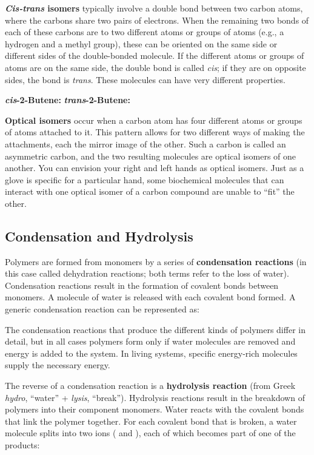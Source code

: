\documentclass{report}
\begin{document}
\textbf{\emph{Cis-trans} isomers} typically involve a double bond between two carbon atoms, where the carbons share two pairs of electrons. When the remaining two bonds of each of these carbons are to two different atoms or groups of atoms (e.g., a hydrogen and a methyl group), these can be oriented on the same side or different sides of the double-bonded molecule. If the different atoms or groups of atoms are on the same side, the double bond is called \emph{cis}; if they are on opposite sides, the bond is \emph{trans}. These molecules can have very different properties.
\begin{center}
\textbf{\emph{cis}-2-Butene:}  \qquad
\textbf{\emph{trans}-2-Butene:} 
\end{center}

\textbf{Optical isomers} occur when a carbon atom has four different atoms or groups of atoms attached to it. This pattern allows for two different ways of making the attachments, each the mirror image of the other. Such a carbon is called an asymmetric carbon, and the two resulting molecules are optical isomers of one another. You can envision your right and left hands as optical isomers. Just as a glove is specific for a particular hand, some biochemical molecules that can interact with one optical isomer of a carbon compound are unable to ``fit'' the other.

\subsection{Condensation and Hydrolysis}

Polymers are formed from monomers by a series of \textbf{condensation reactions} (in this case called dehydration reactions; both terms refer to the loss of water). Condensation reactions result in the formation of covalent bonds between monomers. A molecule of water is released with each covalent bond formed. A generic condensation reaction can be represented as:
\begin{center}
\end{center}
The condensation reactions that produce the different kinds of polymers differ in detail, but in all cases polymers form only if water molecules are removed and energy is added to the system. In living systems, specific energy-rich molecules supply the necessary energy.

The reverse of a condensation reaction is a \textbf{hydrolysis reaction} (from Greek \emph{hydro}, ``water'' + \emph{lysis}, ``break''). Hydrolysis reactions result in the breakdown of polymers into their component monomers. Water reacts with the covalent bonds that link the polymer together. For each covalent bond that is broken, a water molecule splits into two ions ( and ), each of which becomes part of one of the products:
\begin{center}
\end{center}
\end{document}
